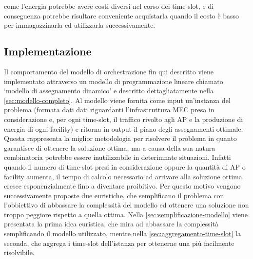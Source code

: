come l'energia potrebbe avere costi diversi nel corso dei time-slot, e di conseguenza potrebbe risultare conveniente acquistarla quando il costo è basso per immagazzinarla ed utilizzarla successivamente.


%
%
\subsection{Implementazione}
\label{sub-sec:implementazione}

Il comportamento del modello di orchestrazione fin qui descritto viene implementato attraverso un modello di programmazione lineare chiamato `modello di assegnamento dinamico' e descritto dettagliatamente nella \autoref{sec:modello-completo}. Al modello viene fornita come input un'instanza del problema (formata dati dati riguardanti l'infrastruttura MEC presa in considerazione e, per ogni time-slot, il traffico rivolto agli AP e la produzione di energia di ogni facility) e ritorna in output il piano degli assegnamenti ottimale. Questa rappresenta la miglior metodologia per risolvere il problema in quanto garantisce di ottenere la soluzione ottima, ma a causa della sua natura combinatoria potrebbe essere inutilizzabile in deterimnate situazioni. Infatti quando il numero di time-slot presi in considerazione oppure la quantità di AP o facility aumenta, il tempo di calcolo necessario ad arrivare alla soluzione ottima cresce esponenzialmente fino a diventare proibitivo. Per questo motivo vengono successivamente proposte due euristiche, che semplificano il problema con l'obbiettivo di abbassare la complessità del modello ed ottenere una soluzione non troppo peggiore rispetto a quella ottima. Nella \autoref{sec:semplificazione-modello} viene presentata la prima idea euristica, che mira ad abbassare la complessità semplificando il modello utilizzato, mentre nella \autoref{sec:aggregamento-time-slot} la seconda, che aggrega i time-slot dell'istanza per ottenerne una più facilmente risolvibile.
